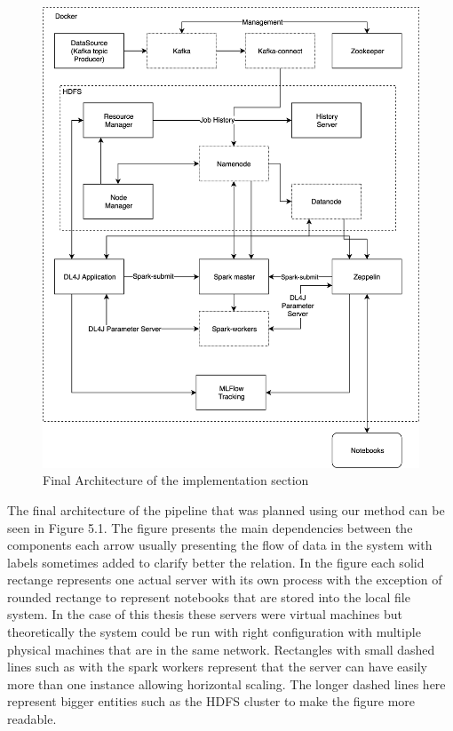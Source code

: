 \begin{figure}[ht!]
    \includegraphics[scale=0.20]{images/architecture} 
    \centering
    \caption{Final Architecture of the implementation section}
\end{figure}

The final architecture of the pipeline that was planned using our method can be seen in Figure 5.1.
The figure presents the main dependencies between the components each arrow usually presenting the flow of data in the system with labels sometimes added to clarify better the relation.
In the figure each solid rectange represents one actual server with its own process with the exception of rounded rectange to represent notebooks that are stored into the local file system.
In the case of this thesis these servers were virtual machines but theoretically the system could be run with right configuration with multiple physical machines that are in the same network.
Rectangles with small dashed lines such as with the spark workers represent that the server can have easily more than one instance allowing horizontal scaling.
The longer dashed lines here represent bigger entities such as the HDFS cluster to make the figure more readable.

